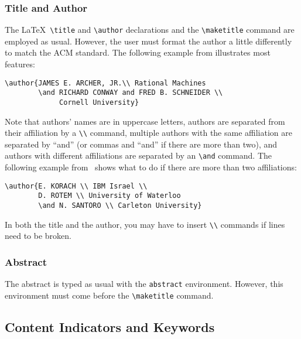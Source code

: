 \subsubsection{Title and Author}
The \LaTeX\ \verb|\title| and \verb|\author| declarations and the
\verb|\maketitle| command are employed as usual.  However, the user
must format the author a little differently to match the ACM standard.
The following example from \cite{6:1(1)} illustrates most features:
\begin{verbatim}
\author{JAMES E. ARCHER, JR.\\ Rational Machines
        \and RICHARD CONWAY and FRED B. SCHNEIDER \\ 
             Cornell University}
\end{verbatim}
Note that authors' names are in uppercase letters, authors are
separated from their affiliation by a \verb|\\| command, multiple
authors with the same affiliation are separated by ``and'' (or commas
and ``and'' if there are more than two), and authors with different
affiliations are separated by an \verb|\and| command.  The following
example from~\cite{6:3(380)} shows what to do if there are more than
two affiliations:
\begin{verbatim}
\author{E. KORACH \\ IBM Israel \\
        D. ROTEM \\ University of Waterloo
        \and N. SANTORO \\ Carleton University}
\end{verbatim}
In both the title and the author, you may have to insert \verb|\\|
commands if lines need to be broken. 

\subsubsection{Abstract}
The abstract is typed as usual with the {\tt abstract} environment.
However, this environment must come before the \verb|\maketitle|
command.

\subsection{Content Indicators and Keywords}

